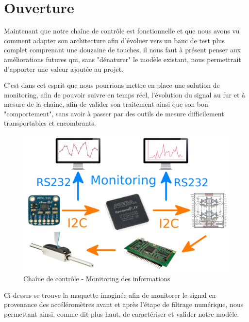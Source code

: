 \documentclass[french,a4paper,12pt]{report}
\begin{document}
		\section{Ouverture}
		
		Maintenant que notre chaîne de contrôle est fonctionnelle et que nous avons vu comment adapter son architecture afin d'évoluer vers un banc de test plus complet comprenant une douzaine de touches, il nous faut à présent penser aux améliorations futures qui, sans "dénaturer" le modèle existant, nous permettrait d'apporter une valeur ajoutée au projet.
		
		C'est dans cet esprit que nous pourrions mettre en place une solution de monitoring, afin de pouvoir suivre en temps réel, l'évolution du signal au fur et à mesure de la chaîne, afin de valider son traitement ainsi que son bon "comportement", sans avoir à passer par des outils de mesure difficilement transportables et encombrants.
		
	\begin{figure}[!ht]
    \center
  	\includegraphics[width=12cm]{CH&MO.png}
		\caption{Chaîne de contrôle - Monitoring des informations}
	\end{figure}
		
	Ci-dessus se trouve la maquette imaginée afin de monitorer le signal en provenance des accéléromètres avant et après l'étape de filtrage numérique, nous permettant ainsi, comme dit plus haut, de caractériser et valider notre modèle.



%
\end{document}
